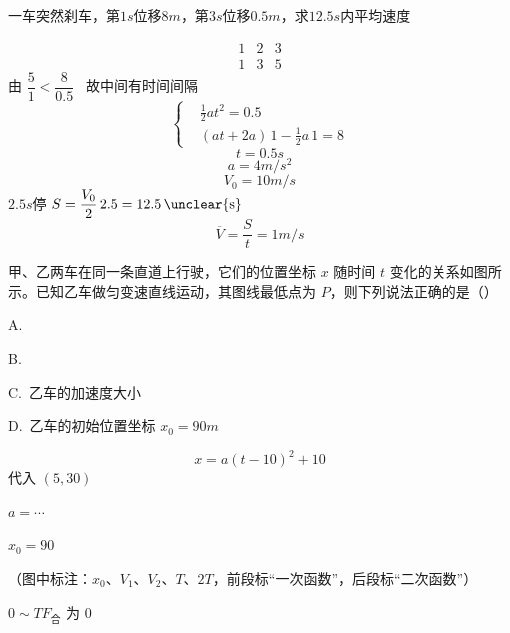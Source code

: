 \begin{problem}
一车突然刹车，第$1\unit{s}$位移$8\unit{m}$，第$3\unit{s}$位移$0.5\unit{m}$，求$12.5\unit{s}$内平均速度
\begin{solution}
\[ \begin{array}{ccc} 1&2&3\\ 1&3&5 \end{array} \]
由 $\dfrac{5}{1}<\dfrac{8}{0.5}$ \ 故中间有时间间隔
\[ \left\{\begin{aligned} &\frac{1}{2}at^2=0.5\\ &(at+2a)\,1-\frac{1}{2}a\,1=8 \end{aligned}\right. \]
\[ t=0.5\unit{s} \]
\[ a=4\unit{m/s^2} \]
\[ V_0=10\unit{m/s} \]
$2.5\unit{s}$停 \quad $S=\dfrac{V_0}{2}\,2.5=12.5\,\text{\unclear{s}}$ %
\[ \overline{V}=\frac{S}{t}=1\unit{m/s} \]
\end{solution}
\end{problem}
\begin{problem}
甲、乙两车在同一条直道上行驶，它们的位置坐标 $x$ 随时间 $t$ 变化的关系如图所示。已知乙车做匀变速直线运动，其图线最低点为 $P$，则下列说法正确的是（\quad）
\par A.\ 
\par B.\ 
\par C.\ 乙车的加速度大小
\par D.\ 乙车的初始位置坐标 $x_0=90\unit{m}$
\begin{solution}
\[ x=a(t-10)^2+10 \]
代入 $(5,30)$\par
$a=\cdots$\par
$x_0=90$
\end{solution}
\end{problem}
（图中标注：$x_0$、$V_1$、$V_2$、$T$、$2T$，前段标“一次函数”，后段标“二次函数”）

$0\sim T$\quad $F_{\text{合}}$ 为 $0$

